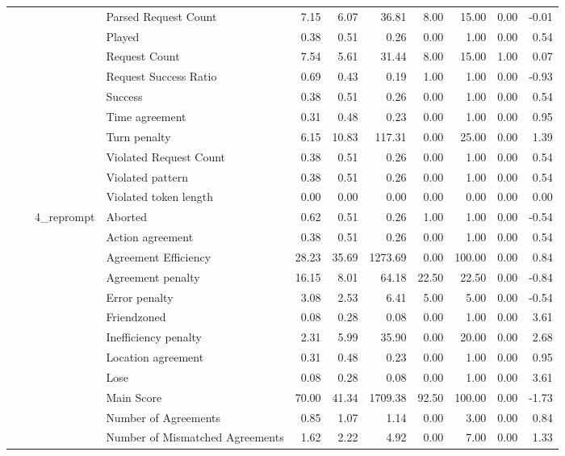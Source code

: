 \begin{tabular}{llllrrrrrrr}
 &  &  & Parsed Request Count & 7.15 & 6.07 & 36.81 & 8.00 & 15.00 & 0.00 & -0.01 \\
 &  &  & Played & 0.38 & 0.51 & 0.26 & 0.00 & 1.00 & 0.00 & 0.54 \\
 &  &  & Request Count & 7.54 & 5.61 & 31.44 & 8.00 & 15.00 & 1.00 & 0.07 \\
 &  &  & Request Success Ratio & 0.69 & 0.43 & 0.19 & 1.00 & 1.00 & 0.00 & -0.93 \\
 &  &  & Success & 0.38 & 0.51 & 0.26 & 0.00 & 1.00 & 0.00 & 0.54 \\
 &  &  & Time agreement & 0.31 & 0.48 & 0.23 & 0.00 & 1.00 & 0.00 & 0.95 \\
 &  &  & Turn penalty & 6.15 & 10.83 & 117.31 & 0.00 & 25.00 & 0.00 & 1.39 \\
 &  &  & Violated Request Count & 0.38 & 0.51 & 0.26 & 0.00 & 1.00 & 0.00 & 0.54 \\
 &  &  & Violated pattern & 0.38 & 0.51 & 0.26 & 0.00 & 1.00 & 0.00 & 0.54 \\
 &  &  & Violated token length & 0.00 & 0.00 & 0.00 & 0.00 & 0.00 & 0.00 & 0.00 \\
\cline{3-11}
 &  & \multirow[t]{27}{*}{4_reprompt} & Aborted & 0.62 & 0.51 & 0.26 & 1.00 & 1.00 & 0.00 & -0.54 \\
 &  &  & Action agreement & 0.38 & 0.51 & 0.26 & 0.00 & 1.00 & 0.00 & 0.54 \\
 &  &  & Agreement Efficiency & 28.23 & 35.69 & 1273.69 & 0.00 & 100.00 & 0.00 & 0.84 \\
 &  &  & Agreement penalty & 16.15 & 8.01 & 64.18 & 22.50 & 22.50 & 0.00 & -0.84 \\
 &  &  & Error penalty & 3.08 & 2.53 & 6.41 & 5.00 & 5.00 & 0.00 & -0.54 \\
 &  &  & Friendzoned & 0.08 & 0.28 & 0.08 & 0.00 & 1.00 & 0.00 & 3.61 \\
 &  &  & Inefficiency penalty & 2.31 & 5.99 & 35.90 & 0.00 & 20.00 & 0.00 & 2.68 \\
 &  &  & Location agreement & 0.31 & 0.48 & 0.23 & 0.00 & 1.00 & 0.00 & 0.95 \\
 &  &  & Lose & 0.08 & 0.28 & 0.08 & 0.00 & 1.00 & 0.00 & 3.61 \\
 &  &  & Main Score & 70.00 & 41.34 & 1709.38 & 92.50 & 100.00 & 0.00 & -1.73 \\
 &  &  & Number of Agreements & 0.85 & 1.07 & 1.14 & 0.00 & 3.00 & 0.00 & 0.84 \\
 &  &  & Number of Mismatched Agreements & 1.62 & 2.22 & 4.92 & 0.00 & 7.00 & 0.00 & 1.33 \\

\end{tabular}

